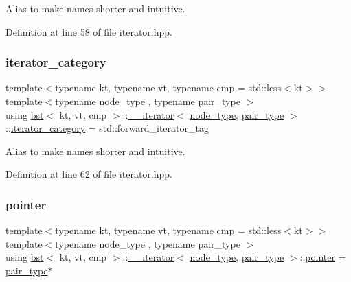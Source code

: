 Alias to make names shorter and intuitive. 

Definition at line 58 of file iterator.\+hpp.

\mbox{\label{classbst_1_1____iterator_a180502873d890f2293f977dd3ace4079}} 
\subsubsection{\texorpdfstring{iterator\+\_\+category}{iterator\_category}}
{\footnotesize\ttfamily template$<$typename kt, typename vt, typename cmp = std\+::less$<$kt$>$$>$ \\
template$<$typename node\+\_\+type , typename pair\+\_\+type $>$ \\
using \hyperlink{classbst}{bst}$<$ kt, vt, cmp $>$\+::\hyperlink{classbst_1_1____iterator}{\+\_\+\+\_\+iterator}$<$ \hyperlink{classbst_a062eb2a1ac54802dbc4f0f74ae2afd01}{node\+\_\+type}, \hyperlink{classbst_a7b11cca2a3b4394915600194f741ab16}{pair\+\_\+type} $>$\+::\hyperlink{classbst_1_1____iterator_a180502873d890f2293f977dd3ace4079}{iterator\+\_\+category} =  std\+::forward\+\_\+iterator\+\_\+tag}

Alias to make names shorter and intuitive. 

Definition at line 62 of file iterator.\+hpp.

\mbox{\label{classbst_1_1____iterator_adb4d1d8f8048f7036ff5ac383ea9c649}} 
\subsubsection{\texorpdfstring{pointer}{pointer}}
{\footnotesize\ttfamily template$<$typename kt, typename vt, typename cmp = std\+::less$<$kt$>$$>$ \\
template$<$typename node\+\_\+type , typename pair\+\_\+type $>$ \\
using \hyperlink{classbst}{bst}$<$ kt, vt, cmp $>$\+::\hyperlink{classbst_1_1____iterator}{\+\_\+\+\_\+iterator}$<$ \hyperlink{classbst_a062eb2a1ac54802dbc4f0f74ae2afd01}{node\+\_\+type}, \hyperlink{classbst_a7b11cca2a3b4394915600194f741ab16}{pair\+\_\+type} $>$\+::\hyperlink{classbst_1_1____iterator_adb4d1d8f8048f7036ff5ac383ea9c649}{pointer} =  \hyperlink{classbst_a7b11cca2a3b4394915600194f741ab16}{pair\+\_\+type}$\ast$}

